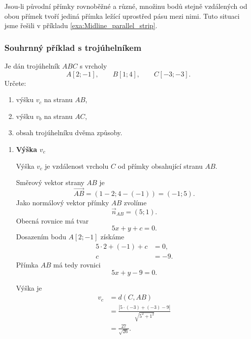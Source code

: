 \begin{remark}\label{rem:Equidistant_parallel_lines}
    Jsou-li původní přímky rovnoběžné a různé, množinu bodů stejně
    vzdálených od obou přímek tvoří jediná přímka ležící uprostřed
    pásu mezi nimi. Tuto situaci jsme řešili v příkladu
    \ref{exa:Midline_parallel_strip}.
\end{remark}


\subsubsection{Souhrnný příklad s trojúhelníkem}
\label{subsubsec:Distance_triangle_summary}

\begin{example}\label{exa:Distance_triangle_altitudes_area}
    Je dán trojúhelník $ABC$ s vrcholy
    \[
        A[2;-1],
        \qquad
        B[1;4],
        \qquad
        C[-3;-3].
    \]
    Určete:
    \begin{enumerate}[label=\alph*)]
        \item výšku $v_c$ na stranu $AB$,
        \item výšku $v_b$ na stranu $AC$,
        \item obsah trojúhelníku dvěma způsoby.
    \end{enumerate}

    \begin{enumerate}[label=\alph*), leftmargin=2em]
        \item \textbf{Výška $v_c$}

        Výška $v_c$ je vzdálenost vrcholu $C$ od přímky obsahující
        stranu $AB$.

        Směrový vektor strany $AB$ je
        \[
            \overrightarrow{AB}
            =
            (1-2;4-(-1))
            =
            (-1;5).
        \]
        Jako normálový vektor přímky $AB$ zvolíme
        \[
            \vec{n}_{AB}=(5;1).
        \]
        Obecná rovnice má tvar
        \[
            5x+y+c=0.
        \]
        Dosazením bodu $A[2;-1]$ získáme
        \begin{align*}
            5\cdot2+(-1)+c&=0,\\
            c&=-9.
        \end{align*}
        Přímka $AB$ má tedy rovnici
        \[
            5x+y-9=0.
        \]

        Výška je
        \begin{align*}
            v_c
            &=
            d(C,AB)\\
            &=
            \frac{|5\cdot(-3)+(-3)-9|}{\sqrt{5^2+1^2}}\\
            &=
            \frac{27}{\sqrt{26}}.
        \end{align*}


\end{enumerate}
\end{example}
